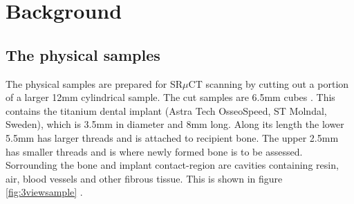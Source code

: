 
\section{Background}


\subsection{The physical samples}

The physical samples are prepared for SR$\mu$CT scanning by cutting out a portion of a larger
12mm cylindrical sample.  The cut samples are 6.5mm cubes . This contains the titanium dental implant (Astra Tech OsseoSpeed, ST Molndal, Sweden), which is 3.5mm in diameter and 8mm long. Along its length the lower 5.5mm has larger threads and is attached to recipient bone. The upper 2.5mm has smaller threads and is where newly formed bone is to be assessed. Sorrounding the bone and implant contact-region are cavities containing resin, air, blood vessels and other fibrous tissue. This is shown in figure \ref{fig:3viewsample} .

